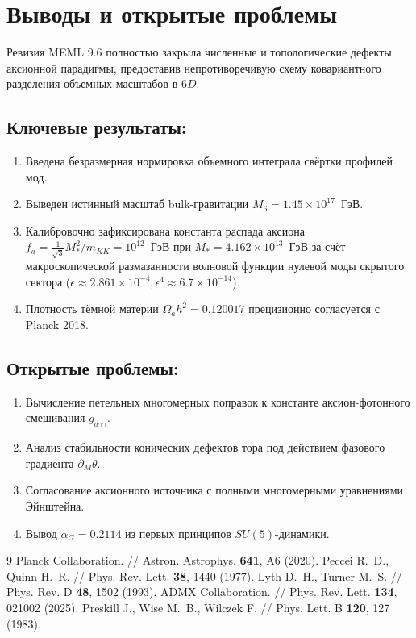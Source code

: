\documentclass[12pt,a4paper]{article}
\begin{document}
\section{Выводы и открытые проблемы}
Ревизия MEML 9.6 полностью закрыла численные и топологические дефекты аксионной парадигмы, предоставив непротиворечивую схему ковариантного разделения объемных масштабов в $6D$.

\subsection*{Ключевые результаты:}
\begin{enumerate}
\item Введена безразмерная нормировка объемного интеграла свёртки профилей мод.
\item Выведен истинный масштаб bulk-гравитации $M_6 = 1.45 \times 10^{17}$~ГэВ.
\item Калибровочно зафиксирована константа распада аксиона $f_a = \frac{1}{\sqrt{3}}M_*^2/m_{KK} = 10^{12}$~ГэВ при $M_* = 4.162 \times 10^{13}$~ГэВ за счёт макроскопической размазанности волновой функции нулевой моды скрытого сектора ($\epsilon \approx 2.861 \times 10^{-4}, \epsilon^4 \approx 6.7 \times 10^{-14}$).
\item Плотность тёмной материи $\Omega_a h^2 = 0.120017$ прецизионно согласуется с Planck 2018.
\end{enumerate}

\subsection*{Открытые проблемы:}
\begin{enumerate}
\item Вычисление петельных многомерных поправок к константе аксион-фотонного смешивания $g_{a\gamma\gamma}$.
\item Анализ стабильности конических дефектов тора под действием фазового градиента $\partial_M \theta$.
\item Согласование аксионного источника с полными многомерными уравнениями Эйнштейна.
\item Вывод $\alpha_G = 0.2114$ из первых принципов $SU(5)$-динамики.
\end{enumerate}

\begin{thebibliography}{9}
 Planck Collaboration. // Astron. Astrophys. \textbf{641}, A6 (2020).
 Peccei R.~D., Quinn H.~R. // Phys. Rev. Lett. \textbf{38}, 1440 (1977).
 Lyth D.~H., Turner M.~S. // Phys. Rev. D \textbf{48}, 1502 (1993).
 ADMX Collaboration. // Phys. Rev. Lett. \textbf{134}, 021002 (2025).
 Preskill J., Wise M.~B., Wilczek F. // Phys. Lett. B \textbf{120}, 127 (1983).
\end{thebibliography}
\end{document}
